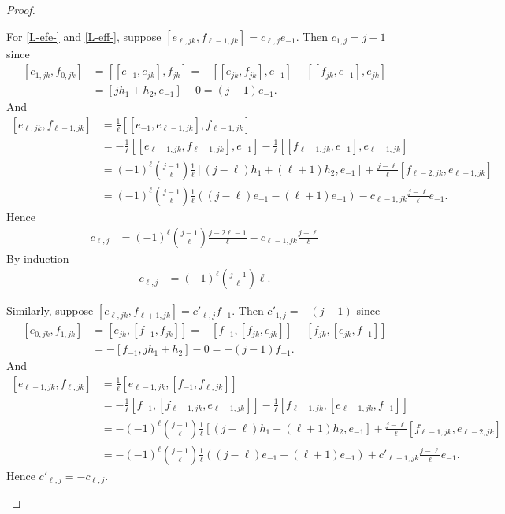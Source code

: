 \documentclass[11pt,letterpaper]{amsart}
\numberwithin{thecounter}{section}
\theoremstyle{definition}
\begin{document}
\begin{proof}
\begin{longver}
For \eqref{L-efe-} and  \eqref{L-eff-}, suppose $\left[e_{\ell,jk}, f_{\ell-1,jk} \right]= c_{\ell, j}e_{-1}$.
Then $c_{1,j} =j-1$ since
\begin{align*}
\left[e_{1,jk}, f_{0,jk} \right]&= \left[\left[e_{-1},e_{jk} \right],f_{jk} \right] =-\left[\left[e_{jk},f_{jk} \right],e_{-1} \right] - \left[\left[f_{jk},e_{-1} \right],e_{jk} \right]\\
 &= \left[jh_1+h_2,e_{-1} \right] - 0 = (j-1)e_{-1}.
 \end{align*}
 And
\begin{align*}
\left[e_{\ell,jk}, f_{\ell-1,jk} \right]&= \frac{1}{\ell}\left[\left[e_{-1},e_{\ell-1,jk} \right],f_{\ell-1,jk} \right]\\
&=-\frac{1}{\ell}\left[\left[e_{\ell-1,jk},f_{\ell-1,jk} \right],e_{-1} \right] -\frac{1}{\ell} \left[\left[f_{\ell-1,jk},e_{-1} \right], e_{\ell-1,jk} \right]\\
&=(-1)^{\ell}\binom{j-1}{\ell}\frac{1}{\ell}\left[(j-\ell)h_1+(\ell+1)h_2, e_{-1} \right] + \frac{j-\ell}{\ell}\left[f_{\ell-2,jk}, e_{\ell-1,jk} \right]\\
&=(-1)^{\ell}\binom{j-1}{\ell}\frac{1}{\ell}\left((j-\ell)e_{-1} -(\ell+1)e_{-1} \right)-c_{\ell-1,jk}\frac{j-\ell}{\ell} e_{-1}.
\end{align*}
Hence
\begin{align*}
c_{\ell,j} &=(-1)^{\ell} \binom{j-1}{\ell}\frac{j-2\ell-1}{\ell}  -c_{\ell-1,jk} \frac{j-\ell}{\ell}
\end{align*}
By induction 
\begin{align*}
c_{\ell,j} &=(-1)^{\ell}\binom{j-1}{\ell}\ell.
\end{align*}

Similarly, suppose $\left[e_{\ell,jk}, f_{\ell+1,jk}\right]= c'_{\ell, j}f_{-1}$.
Then $c'_{1,j} =-(j-1)$ since
\begin{align*}
\left[e_{0,jk}, f_{1,jk} \right]&= \left[e_{jk},\left[f_{-1},f_{jk} \right] \right] =-\left[f_{-1},\left[f_{jk},e_{jk} \right] \right] - \left[f_{jk},\left[e_{jk},f_{-1} \right] \right]\\
 &= -\left[f_{-1},jh_1+h_2 \right] - 0 =- (j-1)f_{-1}.
 \end{align*}
 And
\begin{align*}
\left[e_{\ell-1,jk}, f_{\ell,jk} \right]&= \frac{1}{\ell}\left[e_{\ell-1,jk},\left[f_{-1},f_{\ell,jk} \right] \right]\\
&=-\frac{1}{\ell}\left[f_{-1},\left[f_{\ell-1,jk},e_{\ell-1,jk} \right] \right] -\frac{1}{\ell} \left[f_{\ell-1,jk}, \left[e_{\ell-1,jk},f_{-1} \right] \right]\\
&=-(-1)^{\ell}\binom{j-1}{\ell}\frac{1}{\ell}\left[(j-\ell)h_1+(\ell+1)h_2, e_{-1} \right] + \frac{j-\ell}{\ell}\left[f_{\ell-1,jk}, e_{\ell-2,jk} \right]\\
&=-(-1)^{\ell}\binom{j-1}{\ell}\frac{1}{\ell}\left((j-\ell)e_{-1} -(\ell+1)e_{-1} \right)+c'_{\ell-1,jk}\frac{j-\ell}{\ell} e_{-1}.
\end{align*}
Hence $c'_{\ell, j} =-c_{\ell, j}$.
\end{longver}
\end{proof}
\end{document}
